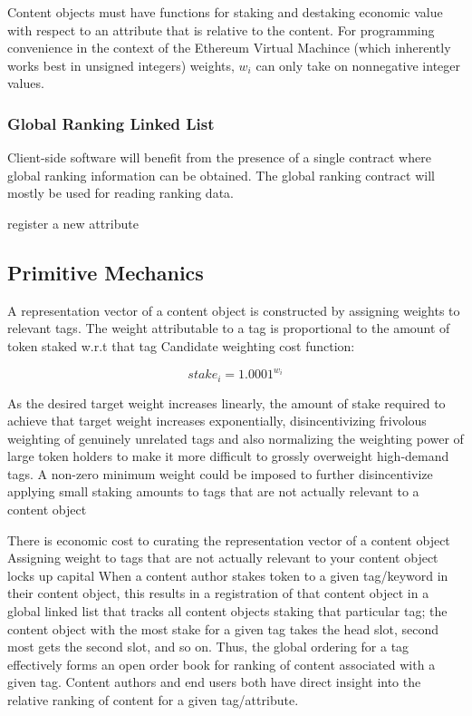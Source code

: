 Content objects must have functions for staking and destaking economic value with respect to an attribute that is relative to the content. For programming convenience in the context of the Ethereum Virtual Machince (which inherently works best in unsigned integers) weights, $w_i$ can only take on nonnegative integer values. 

\subsubsection{Global Ranking Linked List}

Client-side software will benefit from the presence of a single contract where global ranking information can be obtained. The global ranking contract will mostly be used for reading ranking data. 

register a new attribute

\subsection{Primitive Mechanics}
\label{PrimitiveMechanics}
A representation vector of a content object is constructed by assigning weights to relevant tags. 
The weight attributable to a tag is proportional to the amount of token staked w.r.t that tag
Candidate weighting cost function: 

\begin{equation}
    stake_i = 1.0001^{w_i}
\end{equation}

As the desired target weight increases linearly, the amount of stake required to achieve that target weight increases exponentially, disincentivizing frivolous weighting of genuinely unrelated tags and also normalizing the weighting power of large token holders to make it more difficult to grossly overweight high-demand tags. 
A non-zero minimum weight could be imposed to further disincentivize applying small staking amounts to tags that are not actually relevant to a content object

There is economic cost to curating the representation vector of a content object
Assigning weight to tags that are not actually relevant to your content object locks up capital 
When a content author stakes token to a given tag/keyword in their content object, this results in a registration of that content object in a global linked list that tracks all content objects staking that particular tag; the content object with the most stake for a given tag takes the head slot, second most gets the second slot, and so on. 
Thus, the global ordering for a tag effectively forms an open order book for ranking of content associated with a given tag. Content authors and end users both have direct insight into the relative ranking of content for a given tag/attribute. 


